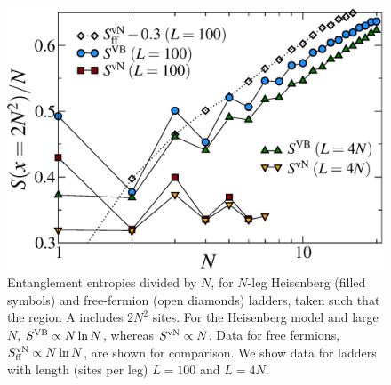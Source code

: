 \begin{figure} { \includegraphics[width=5.5in]{./figures/paper1/figure4/fig4.eps}
 \caption[Area Law in 2D Heis model]{
 {\color{red} Entanglement entropies divided by $N$,  for $N$-leg Heisenberg
(filled symbols) and free-fermion (open diamonds) ladders, taken such that
the region A includes $2N^2$ sites.  
For the Heisenberg model and large $N$, $S^{\rm VB}\propto N \ln N$,
whereas $S^{\rm vN}\propto N$.  
Data for free fermions, $S^{\rm vN}_{\rm ff}\propto N \ln N$,  are shown for comparison.
We show data for ladders with length (sites per leg) $L =100$ and
$L=4N$.  
}
\label{zigzag}}} 
\end{figure}
